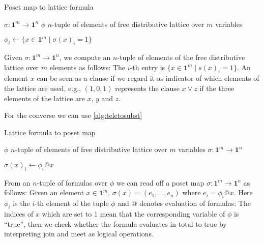 \documentclass{llncs}
\newcommand{\meet}{\vee}
\newcommand{\pint}[1]{\mathbf{1}^{#1}}
\begin{document}
\begin{proposition}
\begin{algorithm}[H]
  \caption{Poset map to lattice formula}\label{alg:subst2tele}
  \begin{algorithmic}
    \Require $\sigma : \pint{m} \to \pint{n}$
    \Ensure $\phi$ $n$-tuple of elements of free distributive lattice over $m$ variables

      \State $\phi_i \gets \{ x \in \pint{m} \mid \sigma(x)_i = 1 \}$
      \Comment{$\mathcal{O}(2^m)$ many elements in $\pint{m}$}
    \EndFor
    \State {}
    \EndProcedure
  \end{algorithmic}
\end{algorithm}

Given $\sigma : \pint{m} \to \pint{n}$, we compute an $n$-tuple of elements of the
free distributive lattice over $m$ elements as follows:
The $i$-th entry is $\{ x \in \pint{m} \mid s(x)_i = 1 \}$. An element $x$ can be
seen as a clause if we regard it as indicator of which elements of the lattice
are used, e.g., $(1,0,1)$ represents the clause $x \meet z$ if the three
elements of the lattice are $x$, $y$ and $z$.


For the converse we can use \autoref{alg:teletosubst}

\begin{algorithm}[H]
  \caption{Lattice formula to poset map}\label{alg:teletosubst}
  \begin{algorithmic}
    \Require $\phi$ $n$-tuple of elements of free distributive lattice over $m$ variables
    \Ensure $\sigma : \pint{m} \to \pint{n}$

    \For{$x \gets \pint{m}$} 
        \State $\sigma(x)_i \gets \phi_i @ x$
      \EndFor
    \EndFor
    \State \Return{$\sigma$}
    \EndProcedure
  \end{algorithmic}
\end{algorithm}

From an $n$-tuple of formulas over $\phi$ we can read off a poset map $\sigma :
\pint{m} \to \pint{n}$ as follows: Given an element $x \in \pint{m}$, $\sigma(x) = (e_1
, ... , e_n) $ where $e_i = \phi_i @ x$. Here $\phi_i$ is the $i$-th element of
the tuple $\phi$ and $@$ denotes evaluation of formulas: The indices of $x$
which are set to 1 mean that the corresponding variable of $\phi$ is ``true'',
then we check whether the formula evaluates in total to true by interpreting
join and meet as logical operations.


\end{proposition}
\end{document}
